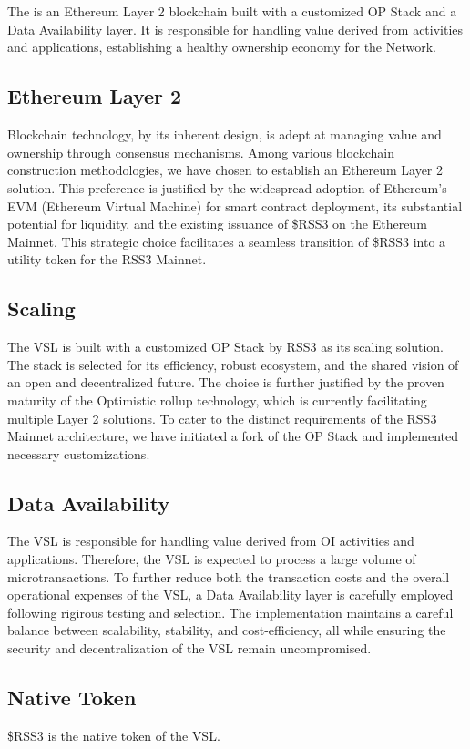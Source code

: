 \section{}
\label{sec:VSL}

The  is an Ethereum Layer 2 blockchain built with a customized OP Stack \cite{op-fork} and a Data Availability layer.
It is responsible for handling value derived from  activities and applications, establishing a healthy ownership economy for the Network.

\subsection{Ethereum Layer 2}

Blockchain technology, by its inherent design, is adept at managing value and ownership through consensus mechanisms.
Among various blockchain construction methodologies, we have chosen to establish an Ethereum Layer 2 solution.
This preference is justified by the widespread adoption of Ethereum's EVM (Ethereum Virtual Machine) for smart contract deployment, its substantial potential for liquidity, and the existing issuance of \$RSS3 on the Ethereum Mainnet. 
This strategic choice facilitates a seamless transition of \$RSS3 into a utility token for the RSS3 Mainnet.

\subsection{Scaling}
The \gls{VSL} is built with a customized OP Stack by RSS3 as its scaling solution.
The stack is selected for its efficiency, robust ecosystem, and the shared vision of an open and decentralized future.
The choice is further justified by the proven maturity of the Optimistic rollup technology, which is currently facilitating multiple Layer 2 solutions.
To cater to the distinct requirements of the RSS3 Mainnet architecture, we have initiated a fork of the OP Stack and implemented necessary customizations.

\subsection{Data Availability}

The \gls{VSL} is responsible for handling value derived from \gls{OI} activities and applications.
Therefore, the \gls{VSL} is expected to process a large volume of microtransactions.
To further reduce both the transaction costs and the overall operational expenses of the \gls{VSL}, a Data Availability layer is carefully employed following rigirous testing and selection.
The implementation maintains a careful balance between scalability, stability, and cost-efficiency, all while ensuring the security and decentralization of the \gls{VSL} remain uncompromised.

\subsection{Native Token}

\$RSS3 is the native token of the \gls{VSL}.
